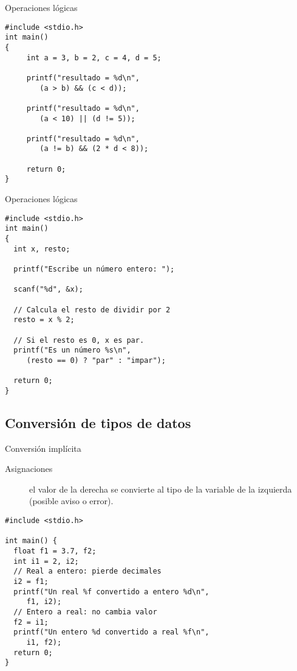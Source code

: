 \documentclass[xcolor={usenames,svgnames,dvipsnames}, aspectratio=169]{beamer}
\begin{document}
\begin{frame}[label={sec:org9ce2394},fragile]{Operaciones lógicas}
 \lstset{language=C,label= ,caption= ,captionpos=b,numbers=none}
\begin{lstlisting}
#include <stdio.h>
int main() 
{ 
     int a = 3, b = 2, c = 4, d = 5; 
      
     printf("resultado = %d\n",
	    (a > b) && (c < d)); 

     printf("resultado = %d\n",
	    (a < 10) || (d != 5)); 

     printf("resultado = %d\n",
	    (a != b) && (2 * d < 8)); 

     return 0;	    
} 
\end{lstlisting}
\end{frame}
\begin{frame}[label={sec:orgfc72241},fragile,plain]{Operaciones lógicas}
 \lstset{language=C,label= ,caption= ,captionpos=b,numbers=none}
\begin{lstlisting}
#include <stdio.h>
int main() 
{ 
  int x, resto;

  printf("Escribe un número entero: ");

  scanf("%d", &x);

  // Calcula el resto de dividir por 2
  resto = x % 2;

  // Si el resto es 0, x es par.
  printf("Es un número %s\n",
	 (resto == 0) ? "par" : "impar");

  return 0;
} 
\end{lstlisting}
\end{frame}

\subsection{Conversión de tipos de datos}
\label{sec:org13a3e6f}

\begin{frame}[label={sec:org9fa3ce3},fragile]{Conversión implícita}
 \begin{description}
\item[{Asignaciones}] el valor de la derecha se convierte al tipo de la variable de la izquierda (posible aviso o error).
\end{description}
\lstset{language=C,label= ,caption= ,captionpos=b,numbers=none}
\begin{lstlisting}
#include <stdio.h>

int main() {
  float f1 = 3.7, f2;
  int i1 = 2, i2;
  // Real a entero: pierde decimales
  i2 = f1;
  printf("Un real %f convertido a entero %d\n", 
	 f1, i2);
  // Entero a real: no cambia valor
  f2 = i1;
  printf("Un entero %d convertido a real %f\n",
	 i1, f2);
  return 0;
}
\end{lstlisting}
\end{frame}
\end{document}
